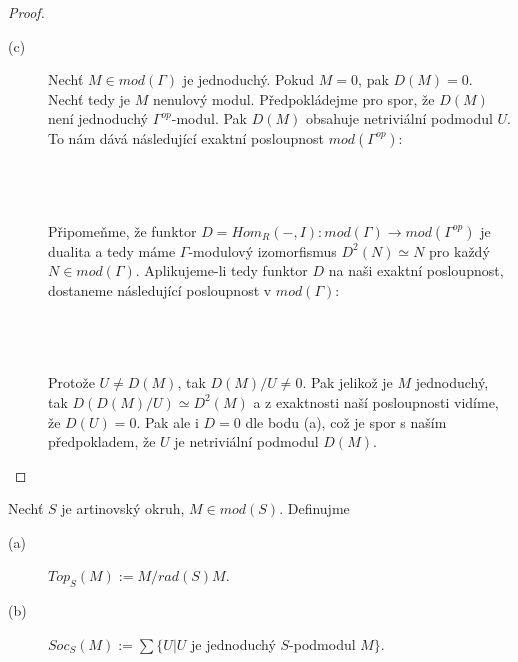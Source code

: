\begin{proof}
\begin{description}
         \item[(c)] Nechť $M\in mod(\Gamma)$ je jednoduchý. Pokud $M=0$, pak $D(M)=0$. 
           Nechť tedy je $M$ nenulový modul.  Předpokládejme pro spor, že $D(M)$ není jednoduchý 
           $\Gamma^{op}$-modul. Pak $D(M)$ obsahuje netriviální podmodul $U$. 
           To nám dává následující exaktní posloupnost $mod(\Gamma^{op})$:
           \\\\
           \centerline{} \\\\
           Připomeňme, že funktor $D=Hom_R(-,I):mod(\Gamma)\rightarrow mod(\Gamma^{op})$ 
           je dualita a tedy máme $\Gamma$-modulový izomorfismus $D^2(N)\simeq N$ 
           pro každý $N\in mod(\Gamma)$. Aplikujeme-li tedy funktor $D$ na naši exaktní posloupnost, 
           dostaneme následující posloupnost v $mod(\Gamma)$:          
           \\\\
           \centerline{} \\\\
           Protože $U\neq D(M)$, tak $D(M)/U\neq 0$. Pak jelikož je $M$  
           jednoduchý, tak $D(D(M)/U)\simeq D^2(M)$ a z exaktnosti naší 
           posloupnosti vidíme, že  $D(U)=0$. Pak ale i $D=0$ dle bodu (a), což 
           je spor s naším předpokladem, že $U$ je netriviální podmodul $D(M)$.
       \end{description}
     \end{proof}
     
     \begin{dfn}
       Nechť $S$ je artinovský okruh, $M\in mod(S)$.  Definujme
       \begin{description}
         \item[(a)] $Top_S(M):=M/rad(S)M$.
         \item[(b)] $Soc_S(M):=\sum\{U|U$ je jednoduchý $S$-podmodul  $M\}$.
       \end{description} 
     \end{dfn}
     
